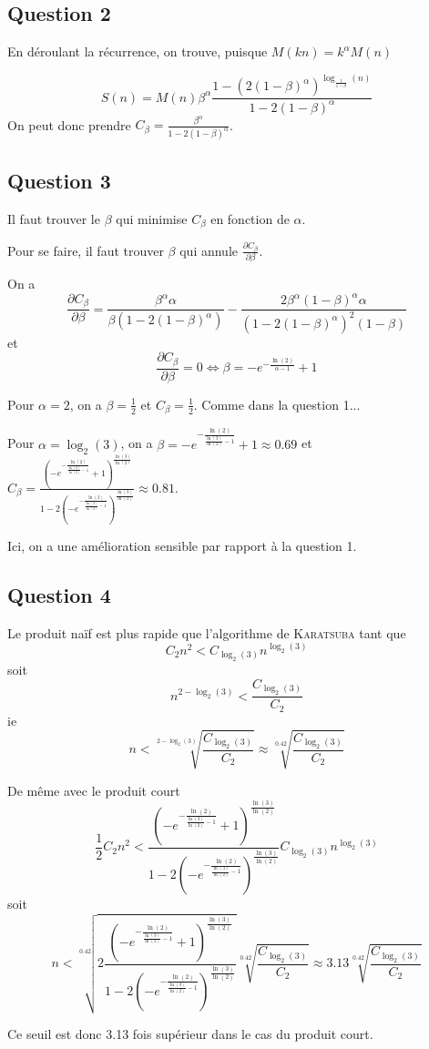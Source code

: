 \subsection*{Question 2}

En déroulant la récurrence, on trouve, puisque $M(kn) = k^\alpha M(n)$

\[
    S(n) = M(n) \beta^\alpha \frac{1-(2(1-\beta)^\alpha)^{\log_{\frac{1}{1-\beta}} (n)}}{1-2(1-\beta)^\alpha}
\]
On peut donc prendre $C_\beta = \frac{\beta^\alpha}{1-2(1-\beta)^\alpha}$.

\subsection*{Question 3}

Il faut trouver le $\beta$ qui minimise $C_\beta$ en fonction de $\alpha$.

Pour se faire, il faut trouver $\beta$ qui annule $\frac{\partial C_\beta}{\partial \beta}$.

On a 
\[
    \frac{\partial C_\beta}{\partial \beta} =  \frac{\beta^\alpha \alpha}{\beta(1-2(1-\beta)^\alpha)}-\frac{2\beta^\alpha(1-\beta)^\alpha \alpha}{(1-2(1-\beta)^\alpha)^2(1-\beta)}
\]
et
\[
    \frac{\partial C_\beta}{\partial \beta} = 0 \Leftrightarrow \beta = -e^{-\frac{\ln(2)}{\alpha-1}} +1
\]

\bigskip

Pour $\alpha =2$, on a $\beta = \frac{1}{2}$ et $C_\beta = \frac{1}{2}$. Comme dans la question 1...

Pour $\alpha = \log_2(3)$, on a $\beta = -e^{-\frac{\ln(2)}{\frac{\ln(3)}{\ln(2)}-1}}+1\approx 0.69$ et $C_\beta = \frac{\left ( -e^{-\frac{\ln(2)}{\frac{\ln(3)}{\ln(2)}-1}}+1\right)^{\frac{\ln(3)}{\ln(2)}}}{1-2\left ( -e^{-\frac{\ln(2)}{\frac{\ln(3)}{\ln(2)}-1}}\right)^{\frac{\ln(3)}{\ln(2)}}}\approx 0.81$.

Ici, on a une amélioration sensible par rapport à la question 1.

\subsection*{Question 4}

Le produit naïf est plus rapide que l'algorithme de \textsc{Karatsuba} tant que
\[
    C_2 n^2 < C_{\log_2(3)} n^{\log_2(3)}
\]
soit 
\[
    n^{2-\log_2(3)} < \frac{C_{\log_2(3)}}{C_2}
\]
ie
\[
    n < \sqrt[2-\log_2(3)]{\frac{C_{\log_2(3)}}{C_2}} \approx \sqrt[0.42]{\frac{C_{\log_2(3)}}{C_2}}
\]

De même avec le produit court
\[
    \frac{1}{2}C_2n^2 < \frac{\left ( -e^{-\frac{\ln(2)}{\frac{\ln(3)}{\ln(2)}-1}}+1\right)^{\frac{\ln(3)}{\ln(2)}}}{1-2\left ( -e^{-\frac{\ln(2)}{\frac{\ln(3)}{\ln(2)}-1}}\right)^{\frac{\ln(3)}{\ln(2)}}} C_{\log_2(3)}n^{\log_2(3)}
\]
soit
\[
    n < \sqrt[0.42]{2\frac{\left ( -e^{-\frac{\ln(2)}{\frac{\ln(3)}{\ln(2)}-1}}+1\right)^{\frac{\ln(3)}{\ln(2)}}}{1-2\left ( -e^{-\frac{\ln(2)}{\frac{\ln(3)}{\ln(2)}-1}}\right)^{\frac{\ln(3)}{\ln(2)}}}} \sqrt[0.42]{\frac{C_{\log_2(3)}}{C_2}} \approx 3.13 \sqrt[0.42]{\frac{C_{\log_2(3)}}{C_2}}
\]

Ce seuil est donc 3.13 fois supérieur dans le cas du produit court.



